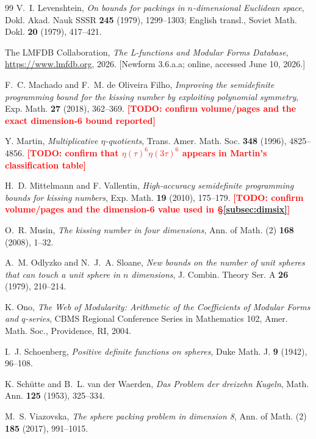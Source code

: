 \documentclass[11pt,reqno]{amsart}
\theoremstyle{plain}
\theoremstyle{definition}
\theoremstyle{remark}
\newcommand{\TODO}[1]{\textcolor{red}{\textbf{[TODO: #1]}}}
\begin{document}
\begin{thebibliography}{99}
V.~I. Levenshtein,
\emph{On bounds for packings in $n$-dimensional Euclidean space},
Dokl. Akad. Nauk SSSR \textbf{245} (1979), 1299--1303;
English transl., Soviet Math. Dokl. \textbf{20} (1979), 417--421.

The LMFDB Collaboration,
\emph{The L-functions and Modular Forms Database},
\url{https://www.lmfdb.org}, 2026.
[Newform \textsf{3.6.a.a}; online, accessed June 10, 2026.]

F.~C. Machado and F.~M. de Oliveira Filho,
\emph{Improving the semidefinite programming bound for the kissing
number by exploiting polynomial symmetry},
Exp. Math. \textbf{27} (2018), 362--369.
\TODO{confirm volume/pages and the exact dimension-6 bound reported}

Y. Martin,
\emph{Multiplicative $\eta$-quotients},
Trans. Amer. Math. Soc. \textbf{348} (1996), 4825--4856.
\TODO{confirm that $\eta(\tau)^6\eta(3\tau)^6$ appears in Martin's
classification table}

H.~D. Mittelmann and F. Vallentin,
\emph{High-accuracy semidefinite programming bounds for kissing
numbers},
Exp. Math. \textbf{19} (2010), 175--179.
\TODO{confirm volume/pages and the dimension-6 value used in
\S\ref{subsec:dimsix}}

O.~R. Musin,
\emph{The kissing number in four dimensions},
Ann. of Math. (2) \textbf{168} (2008), 1--32.

A.~M. Odlyzko and N.~J.~A. Sloane,
\emph{New bounds on the number of unit spheres that can touch a unit
sphere in $n$ dimensions},
J. Combin. Theory Ser. A \textbf{26} (1979), 210--214.

K. Ono,
\emph{The Web of Modularity: Arithmetic of the Coefficients of Modular
Forms and $q$-series},
CBMS Regional Conference Series in Mathematics 102, Amer. Math. Soc.,
Providence, RI, 2004.

I.~J. Schoenberg,
\emph{Positive definite functions on spheres},
Duke Math. J. \textbf{9} (1942), 96--108.

K. Sch\"utte and B.~L. van der Waerden,
\emph{Das Problem der dreizehn Kugeln},
Math. Ann. \textbf{125} (1953), 325--334.

M.~S. Viazovska,
\emph{The sphere packing problem in dimension 8},
Ann. of Math. (2) \textbf{185} (2017), 991--1015.

\end{thebibliography}
\end{document}
